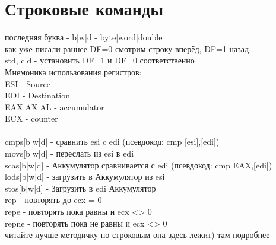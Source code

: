\documentclass[a4paper,10pt]{article}
\begin{document}
\section*{Строковые команды}
последняя буква - b|w|d - byte|word|double \\
как уже писали раннее DF=0 смотрим строку вперёд, DF=1 назад \\
std, cld - установить DF=1 и DF=0 соответственно \\
Мнемоника использования регистров: \\
ESI - Source \\
EDI - Destination \\
EAX|AX|AL - accumulator \\
ECX - counter \\
\vspace{0.2cm} \\
cmps[b|w|d] - сравнить esi c edi (псевдокод: cmp [esi],[edi])\\
movs[b|w|d] - переслать из esi в edi\\
scas[b|w|d] - Аккумулятор сравнивается с edi (псевдокод: cmp EAX,[edi]) \\
lods[b|w|d] - загрузить в Аккумулятор из esi \\
stos[b|w|d] - Загрузить в edi Аккумулятор \\
rep - повторять до ecx = 0 \\
repe - повторять пока равны и ecx <> 0 \\
repne - повторять пока не равны и ecx <> 0 \\
читайте лучше методичку по строковым она здесь лежит) там подробнее
\end{document}
